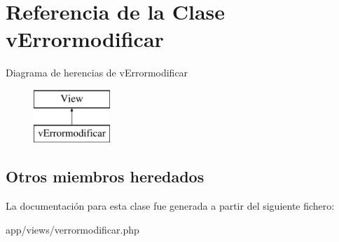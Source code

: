 \hypertarget{classv_errormodificar}{}\section{Referencia de la Clase v\+Errormodificar}
\label{classv_errormodificar}
Diagrama de herencias de v\+Errormodificar\begin{figure}[H]
\begin{center}
\leavevmode
\includegraphics[height=2.000000cm]{classv_errormodificar}
\end{center}
\end{figure}
\subsection*{Otros miembros heredados}


La documentación para esta clase fue generada a partir del siguiente fichero\+:\begin{DoxyCompactItemize}
\item 
app/views/verrormodificar.\+php\end{DoxyCompactItemize}
